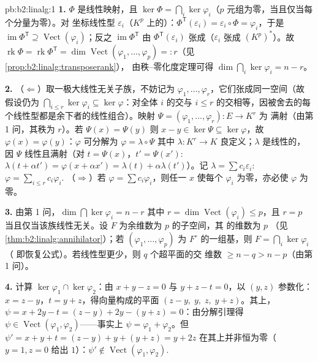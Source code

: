 \begin{solution}{pb:b2:linalg:1}
\textbf{1.} $\Phi$ 是线性映射，且 $\ker\Phi = \bigcap_i
\ker\varphi_i$（$p$ 元组为零，当且仅当每个分量为零）。对
坐标线性型 $\varepsilon_i$（$K^p$ 上的）：$\Phi^{\mathsf
T}(\varepsilon_i) = \varepsilon_i \circ \Phi = \varphi_i$，于是
$\operatorname{im}\Phi^{\mathsf T} \supseteq
\operatorname{Vect}(\varphi_i)$；反之
$\operatorname{im}\Phi^{\mathsf T}$ 由
$\Phi^{\mathsf T}(\varepsilon_i)$ 张成（$\varepsilon_i$ 张成
$(K^p)^*$）。故 $\operatorname{rk}\Phi = \operatorname{rk}
\Phi^{\mathsf T} = \dim\operatorname{Vect}(\varphi_1, \dots,
\varphi_p) =: r$（见\cref{prop:b2:linalg:transposerank}），
由秩--零化度定理可得 $\dim\bigcap_i\ker\varphi_i = n - r$。

\textbf{2.} （$\Leftarrow$）取一极大线性无关子族，不妨记为
$\varphi_1, \dots, \varphi_r$，它们张成同一空间（故
假设仍为 $\bigcap_{i \leq r}\ker\varphi_i \subseteq
\ker\varphi$：对全体 $i$ 的交与
$i \leq r$ 的交相等，因被舍去的每个线性型都是余下者的线性组合）。映射
$\Psi = (\varphi_1, \dots, \varphi_r) \colon E \to K^r$ 为
满射（由第 1 问，其秩为 $r$）。若 $\Psi(x) = \Psi(y)$
则 $x - y \in \ker\Psi \subseteq \ker\varphi$，故 $\varphi(x) =
\varphi(y)$：$\varphi$ 可分解为 $\varphi = \lambda \circ \Psi$
其中 $\lambda \colon K^r \to K$ 良定义；$\lambda$ 是线性的，
因 $\Psi$ 线性且满射（对 $t = \Psi(x)$，$t' =
\Psi(x')$: $\lambda(t + \alpha t') = \varphi(x + \alpha x') =
\lambda(t) + \alpha\lambda(t')$）。记 $\lambda = \sum c_i
\varepsilon_i$: $\varphi = \sum_{i \leq r} c_i\varphi_i$.
（$\Rightarrow$）若 $\varphi = \sum c_i \varphi_i$，则任一 $x$
使每个 $\varphi_i$ 为零，亦必使 $\varphi$ 为零。

\textbf{3.} 由第 1 问，$\dim\bigcap\ker\varphi_i = n - r$
其中 $r = \dim\operatorname{Vect}(\varphi_i) \leq p$，且 $r = p$
当且仅当该族线性无关。设 $F$ 为余维数为 $p$ 的子空间，其
的维数为 $p$
（见\cref{thm:b2:linalg:annihilator}）；若 $(\varphi_1, \dots,
\varphi_p)$ 为 $F^\circ$ 的一组基，则 $F = \bigcap_i\ker\varphi_i$（
即恢复公式）。若线性型更少，则 $q$ 个超平面的交
维数 $\geq n - q > n - p$（由第 1 问）。

\textbf{4.} 计算 $\ker\varphi_1 \cap \ker\varphi_2$：由 $x
+ y - z = 0$ 与 $y + z - t = 0$，以 $(y, z)$ 参数化：$x = z
- y$，$t = y + z$，得向量构成的平面 $(z - y,\; y,\;
z,\; y + z)$。其上，$\psi = x + 2y - t = (z - y) + 2y - (y + z)
= 0$：由分解引理得 $\psi \in
\operatorname{Vect}(\varphi_1, \varphi_2)$——事实上 $\psi =
\varphi_1 + \varphi_2$。但 $\psi' = x + y + t = (z - y) + y +
(y + z) = y + 2z$ 在其上并非恒为零（$y = 1, z = 0$
给出 $1$）：$\psi' \notin \operatorname{Vect}(\varphi_1,
\varphi_2)$.


\end{solution}
